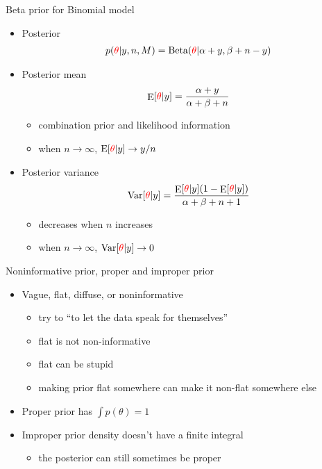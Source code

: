 \documentclass[english,t]{beamer}
\DeclareMathOperator{\E}{E}
\DeclareMathOperator{\Var}{Var}
\begin{document}
\begin{frame}{Beta prior for Binomial model}

  \begin{itemize}
  \item Posterior
    \baselineskip
    \begin{align*}
      p({\color{red} \theta}|y,n,M) = \text{Beta}({\color{red} \theta}|\alpha+y,\beta+n-y)
    \end{align*}
  \item Posterior mean
    \baselineskip
    \begin{align*}
      \E[{\color{red} \theta}|y] = \frac{\alpha+y}{\alpha+\beta+n}
    \end{align*}
    \begin{itemize}
    \item combination prior and likelihood information
    \item when $n\rightarrow\infty$, $\text{E}[{\color{red} \theta}|y]\rightarrow y/n$
    \end{itemize}
    \pause
  \item  Posterior variance
    \baselineskip
    \begin{align*}
      \Var[{\color{red} \theta}|y]=\frac{\E[{\color{red} \theta}|y](1-\E[{\color{red} \theta}|y])}{\alpha+\beta+n+1}
    \end{align*}
    \begin{itemize}
    \item decreases when $n$ increases
    \item when $n\rightarrow\infty$, $\text{Var}[{\color{red} \theta}|y]\rightarrow 0$
    \end{itemize}      
  \end{itemize}

\end{frame}


\begin{frame}{Noninformative prior, proper and improper prior}

  \begin{itemize}
  \item Vague, flat, diffuse, or noninformative
    \begin{itemize}
    \item try to ``to let the data speak for themselves''
    \item flat is not non-informative
    \item flat can be stupid
    \item making prior flat somewhere can make it non-flat somewhere
      else
    \end{itemize}
  \item Proper prior has $\int p(\theta) = 1$
  \item Improper prior density doesn't have a finite integral
    \begin{itemize}
    \item the posterior can still sometimes be proper
    \end{itemize}
  \end{itemize}
  
\end{frame}
\end{document}
